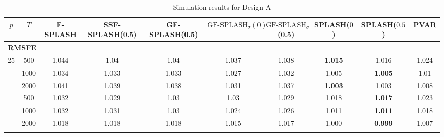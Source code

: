 \begin{landscape}
    \bgroup
    \def\arraystretch{1.3}
    \begin{table}[p]
    \footnotesize
    \centering
    \caption{Simulation results for Design A}
    \label{tab:results_designA}
    \begin{tabular}{cccccccccc}    
    \hline \hline
    $p$  &  $T$   &  F-SPLASH  &  SSF-SPLASH(0.5)  &  GF-SPLASH(0.5)  &  $\text{GF-SPLASH}_\sigma(0)$  &  $\text{GF-SPLASH}_\sigma$(0.5)  &  SPLASH($0$)  &  SPLASH($0.5$)  &  PVAR  \\
    \hline
    \multicolumn{10}{l}{\textbf{RMSFE}} \\
	\hline
	 25  & 500  &         1.044         &                 1.04                  &                       1.04                       &                     1.037                      &                      1.038                       & \textbf{1.015}           & 1.016                      &       1.024       \\ \hdashline
	 25  & 1000 &         1.034         &                 1.033                 &                      1.033                       &                     1.027                      &                      1.032                       & 1.005                    & \textbf{1.005}             &       1.01        \\ \hdashline
	 25  & 2000 &         1.041         &                 1.039                 &                      1.038                       &                     1.031                      &                      1.037                       & \textbf{1.003}           & 1.003                      &       1.008       \\ \hdashline
	 36  & 500  &         1.032         &                 1.029                 &                       1.03                       &                      1.03                      &                      1.029                       & 1.018                    & \textbf{1.017}             &       1.023       \\ \hdashline
	 36  & 1000 &         1.032         &                 1.031                 &                       1.03                       &                     1.024                      &                      1.026                       & 1.011                    & \textbf{1.011}             &       1.018       \\ \hdashline
	 36  & 2000 &         1.018         &                 1.018                 &                      1.018                       &                     1.015                      &                      1.017                       & 1.000                    & \textbf{0.999}             &       1.007       \\ \hdashline

\end{tabular}
\end{table}
\end{landscape}

